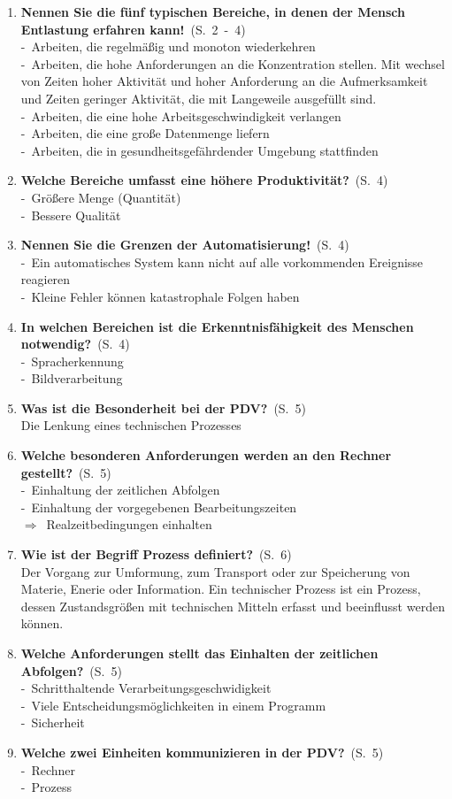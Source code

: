 \documentclass[a4paper,12pt]{article}
\newcommand{\question}[3]{\pagebreak[3]\item {\textbf{#1?}}\ (S.\ #2)#3}
\newcommand{\statement}[3]{\pagebreak[3]\item {\textbf{#1!}}\ (S.\ #2)#3}
\newcommand{\catchword}[1]{\\-\ #1}
\newcommand{\normaltext}[1]{\\#1}
\newcommand{\result}[1]{\\ $\Rightarrow$\ #1}
\newcommand{\page}[1]{#1}
\newcommand{\pages}[2]{#1\ -\ #2}
\begin{document}
\begin{enumerate}
  \statement{Nennen Sie die fünf typischen Bereiche,
             in denen der Mensch Entlastung erfahren kann}{\pages{2}{4}}
  {
    \catchword{Arbeiten, die regelmäßig und monoton wiederkehren}
    \catchword{Arbeiten, die hohe Anforderungen an die Konzentration stellen. Mit wechsel von Zeiten
               hoher Aktivität und hoher Anforderung an die Aufmerksamkeit und Zeiten geringer Aktivität,
               die mit Langeweile ausgefüllt sind.}
    \catchword{Arbeiten, die eine hohe Arbeitsgeschwindigkeit verlangen}
    \catchword{Arbeiten, die eine große Datenmenge liefern}
    \catchword{Arbeiten, die in gesundheitsgefährdender Umgebung stattfinden}
  }

  \question{Welche Bereiche umfasst eine höhere Produktivität}{\page{4}}
  {
    \catchword{Größere Menge (Quantität)}
    \catchword{Bessere Qualität}
  }

  \statement{Nennen Sie die Grenzen der Automatisierung}{\page{4}}
  {
    \catchword{Ein automatisches System kann nicht auf alle vorkommenden Ereignisse reagieren}
    \catchword{Kleine Fehler können katastrophale Folgen haben}
  }

  \question{In welchen Bereichen ist die Erkenntnisfähigkeit des Menschen notwendig}{\page{4}}
  {
    \catchword{Spracherkennung}
    \catchword{Bildverarbeitung}
  }

  \question{Was ist die Besonderheit bei der PDV}{\page{5}}
  {
    \normaltext{Die Lenkung eines technischen Prozesses}
  }

  \question{Welche besonderen Anforderungen werden an den Rechner gestellt}{\page{5}}
  {
    \catchword{Einhaltung der zeitlichen Abfolgen}
    \catchword{Einhaltung der vorgegebenen Bearbeitungszeiten}
    \result{Realzeitbedingungen einhalten}
  }

  \question{Wie ist der Begriff Prozess definiert}{\page{6}}
  {
    \normaltext{Der Vorgang zur Umformung, zum Transport oder zur Speicherung von Materie, 
    Enerie oder Information. Ein technischer Prozess ist ein Prozess, dessen Zustandsgrößen
    mit technischen Mitteln erfasst und beeinflusst werden können.}
  }

  \question{Welche Anforderungen stellt das Einhalten der zeitlichen Abfolgen}{\page{5}}
  {
    \catchword{Schritthaltende Verarbeitungsgeschwidigkeit}
    \catchword{Viele Entscheidungsmöglichkeiten in einem Programm}
    \catchword{Sicherheit}
  }

  \question{Welche zwei Einheiten kommunizieren in der PDV}{\page{5}}
  {
    \catchword{Rechner}
    \catchword{Prozess}
  }


\end{enumerate}
\end{document}
